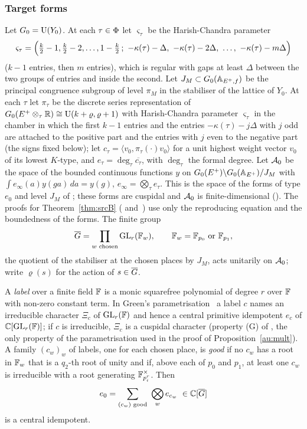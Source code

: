 \documentclass[10pt]{amsart}
\theoremstyle{definition}
\theoremstyle{remark}
\newcommand{\C}{\mathbb C}
\newcommand{\R}{\mathbb R}
\begin{document}
\subsubsection*{Target forms}
Let $G_0=\mathrm U(Y_0)$. At each $\tau\in\Phi$ let $\varsigma_\tau$ be the Harish-Chandra parameter
\[
\varsigma_\tau=\Bigl(\tfrac k2-1,\tfrac k2-2,\dots,1-\tfrac k2\,;\ -\kappa(\tau)-\Delta,\
-\kappa(\tau)-2\Delta,\ \dots,\ -\kappa(\tau)-m\Delta\Bigr)
\]
($k-1$ entries, then $m$ entries), which is regular with gaps at least $\Delta$ between the two
groups of entries and inside the second. Let $J_M\subset G_0(\mathbb A_{E^+,f})$ be the principal
congruence subgroup of level $\pi_M$ in the stabiliser of the lattice of $Y_0$. At each $\tau$ let
$\pi_\tau$ be the discrete series representation of $G_0(E^+\otimes_\tau\R)\cong\auU(k+\varrho,\varrho+1)$
with Harish-Chandra parameter $\varsigma_\tau$ in the chamber in which the first $k-1$ entries and the
entries $-\kappa(\tau)-j\Delta$ with $j$ odd are attached to the positive part and the entries with $j$
even to the negative part (the signs fixed below); let $c_\tau=\langle v_0,\pi_\tau(\cdot)v_0\rangle$ for
a unit highest weight vector $v_0$ of its lowest $K$-type, and $e_\tau=\deg_\tau\overline{c_\tau}$, with
$\deg_\tau$ the formal degree. Let $\mathcal A_0$ be the space of the bounded continuous functions $y$ on
$G_0(E^+)\backslash G_0(\mathbb A_{E^+})/J_M$ with $\int e_\infty(a)y(ga)\,da=y(g)$,
$e_\infty=\bigotimes_\tau e_\tau$. This is the space of the forms of type $e_0$ and level $J_M$ of
{\cite[Definition~8.1]{P49}}; these forms are cuspidal and $\mathcal A_0$ is finite-dimensional
({\cite[Proposition~8.4(a)]{P49}}). The proofs for Theorem~\ref{thm:srcB} ({\cite[\S\S2--4.1 and~5--8.4]{P51}} and~{\cite[\S\S2--6]{P52}}) use only the reproducing equation and the boundedness of the forms. The
finite group
\[
\overline G=\prod_{w\text{ chosen}}\mathrm{GL}_r(\mathbb F_w),\qquad\mathbb F_w=\mathbb F_{p_0}\text{ or }\mathbb F_{p_1},
\]
the quotient of the stabiliser at the chosen places by $J_M$, acts unitarily on $\mathcal A_0$; write
$\varrho(s)$ for the action of $s\in\overline G$.

A \emph{label} over a finite field $\mathbb F$ is a monic squarefree polynomial of degree $r$ over
$\mathbb F$ with non-zero constant term. In Green's parametrisation~\cite{Green1955} a label $c$ names
an irreducible character $\Xi_c$ of $\mathrm{GL}_r(\mathbb F)$ and hence a central primitive idempotent $e_c$ of
$\C[\auGL_r(\auF)]$; if $c$ is irreducible, $\Xi_c$ is a cuspidal character (property (G) of
{\cite[\S4.1.8]{P51}}, the only property of the parametrisation used in the proof of
Proposition~\ref{au:mult}). A family $(c_w)_w$ of labels, one for each chosen place, is \emph{good} if no
$c_w$ has a root in $\mathbb F_w$ that is a $q_2$-th root of unity and if, above each of $p_0$ and
$p_1$, at least one $c_w$ is irreducible with a root generating $\mathbb F_{p_i^r}^\times$. Then
\[
e_0=\sum_{(c_w)\text{ good}}\ \bigotimes_we_{c_w}\ \in\C[\auG]
\]
is a central idempotent.
\end{document}
